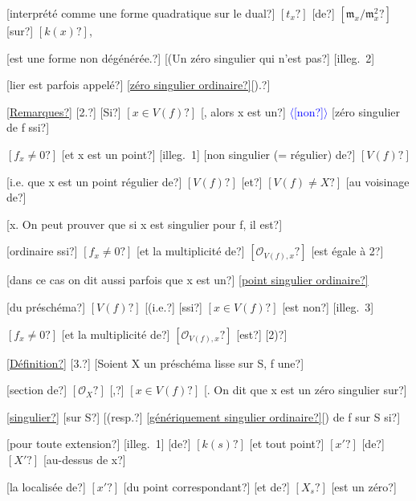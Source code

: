 \documentclass[11pt]{article}
\newcommand{\inserted}[2][]{\textcolor{blue}{$\langle$#2$\rangle$}}
\newcommand{\uline}[1]{\underline{#1}}
\newcommand{\unsure}[1]{[#1?]}
\newcommand{\illegible}[1]{[\textsf{illeg.\ #1}]}
\begin{document}
\unsure{interprété comme une forme quadratique sur le dual} $\unsure{t_x}$ \unsure{de} $\unsure{\mathfrak{m}_x/\mathfrak{m}_x^2}$ \unsure{sur} $\unsure{k(x)}$,

\unsure{est une forme non dégénérée.} \unsure{(Un zéro singulier qui n'est pas} \illegible{2}

\unsure{lier est parfois appelé} \uline{\unsure{zéro singulier ordinaire}}\unsure{).}

\uline{\unsure{Remarques}} \unsure{2.} \unsure{Si} $\unsure{x\in V(f)}$ \unsure{, alors x est un} \inserted{\unsure{non}} \unsure{zéro singulier de f ssi}

$\unsure{f_x \neq 0}$ \unsure{et x est un point} \illegible{1} \unsure{non singulier (= régulier) de} $\unsure{V(f)}$

\unsure{i.e. que x est un point régulier de} $\unsure{V(f)}$ \unsure{et} $\unsure{V(f)\neq X}$ \unsure{au voisinage de}

\unsure{x. On peut prouver que si x est singulier pour f, il est}

\unsure{ordinaire ssi} $\unsure{f_x\neq 0}$ \unsure{et la multiplicité de} $\unsure{\mathcal{O}_{V(f),x}}$ \unsure{est égale à 2}

\unsure{dans ce cas on dit aussi parfois que x est un} \uline{\unsure{point singulier ordinaire}}

\unsure{du préschéma} $\unsure{V(f)}$ \unsure{(i.e.} \unsure{ssi} $\unsure{x\in V(f)}$ \unsure{est non} \illegible{3}

$\unsure{f_x\neq 0}$ \unsure{et la multiplicité de} $\unsure{\mathcal{O}_{V(f),x}}$ \unsure{est} \unsure{2)}

\uline{\unsure{Définition}} \unsure{3.} \unsure{Soient X un préschéma lisse sur S, f une}

\unsure{section de} $\unsure{\mathcal{O}_X}$ \unsure{,} $\unsure{x\in V(f)}$ \unsure{. On dit que x est un zéro singulier sur}

\uline{\unsure{singulier}} \unsure{sur S} \unsure{(resp.} \uline{\unsure{génériquement singulier ordinaire}}\unsure{) de f sur S si}

\unsure{pour toute extension} \illegible{1} \unsure{de} $\unsure{k(s)}$ \unsure{et tout point} $\unsure{x'}$ \unsure{de} $\unsure{X'}$ \unsure{au-dessus de x}

\unsure{la localisée de} $\unsure{x'}$ \unsure{du point correspondant} \unsure{et de} $\unsure{X_s}$ \unsure{est un zéro}
\end{document}
